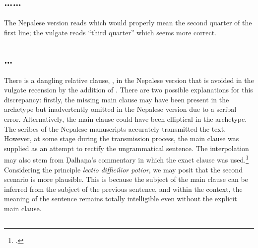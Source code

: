\subsection{\ldots{}\ldots}\label{yogan1}
	
The Nepalese version reads  which would
properly mean the second quarter of the first line; the vulgate reads
 “third quarter” which seems more correct.

\subsection{\ldots{}}		

There is a dangling relative clause,
, in the Nepalese version that is avoided in the vulgate
recension by the addition of . 
There are two possible explanations for this discrepancy: 
firstly, the missing main clause may have been present in the archetype 
but inadvertently omitted in the Nepalese version due to a scribal error. 
Alternatively, the main clause could have been elliptical in the archetype. 
The scribes of the Nepalese manuscripts accurately transmitted the text. 
However, at some stage during the transmission process, 
the main clause was supplied as an attempt to rectify the ungrammatical 
sentence.
The interpolation may also stem from Ḍalhaṇa's commentary in which the exact 
clause was used.\footnote{
 .}
Considering the principle \emph{lectio difficilior potior}, 
we may posit that the second scenario is more plausible. 
This is because the subject of the main clause can be inferred from 
the subject of the previous sentence, and within the context, 
the meaning of the sentence remains totally intelligible even without the explicit 
main clause.
	
\subsection{}
	
